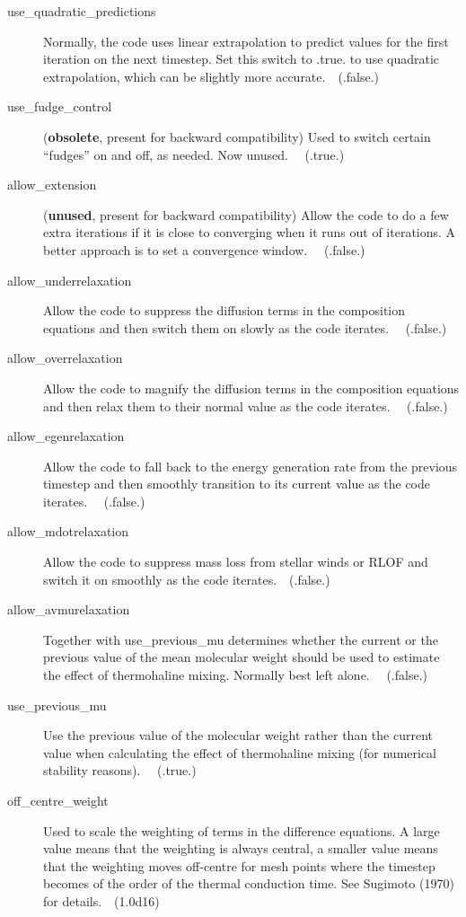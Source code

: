 \begin{description}
\item[use\_quadratic\_predictions]\hypertarget{use_quadratic_predictions}{} Normally, the code uses linear extrapolation to predict values for the first iteration on the next timestep. Set this switch to .true. to use quadratic extrapolation, which can be slightly more accurate.\ \ (.false.)
\item[use\_fudge\_control]\hypertarget{use_fudge_control}{}      (\textbf{obsolete}, present for backward compatibility)  Used to switch certain ``fudges'' on and off, as needed. Now unused. \ \ (.true.)
\item[allow\_extension]\hypertarget{allow_extension}{} (\textbf{unused}, present for backward compatibility) Allow the code to do a few extra iterations if it is close to converging when it runs out of iterations. A better approach is to set a convergence window.  \ \ (.false.)
\item[allow\_underrelaxation]\hypertarget{allow_underrelaxation}{}  Allow the code to suppress the diffusion terms in the composition equations and then switch them on slowly as the code iterates.  \ \ (.false.)
\item[allow\_overrelaxation]\hypertarget{allow_overrelaxation}{}    Allow the code to magnify the diffusion terms in the composition equations and then relax them to their normal value as the code iterates.  \ \ (.false.)
\item[allow\_egenrelaxation]\hypertarget{allow_egenrelaxation}{}    Allow the code to fall back to the energy generation rate from the previous timestep and then smoothly transition to its current value as the code iterates. \ \ (.false.)
\item[allow\_mdotrelaxation]\hypertarget{allow_mdotrelaxation}{}    Allow the code to suppress mass loss from stellar winds or RLOF and switch it on smoothly as the code iterates.\ \ (.false.)
\item[allow\_avmurelaxation]\hypertarget{allow_avmurelaxation}{}   Together with use\_previous\_mu determines whether the current or the previous value of the mean molecular weight should be used to estimate the effect of thermohaline mixing. Normally best left alone. \ \ (.false.)
\item[use\_previous\_mu]\hypertarget{use_previous_mu}{}        Use the previous value of the molecular weight rather than the current value when calculating the effect of thermohaline mixing (for numerical stability reasons).  \ \ (.true.)
\item[off\_centre\_weight]\hypertarget{off_centre_weight}{}      Used to scale the weighting of terms in the difference equations. A large value means that the weighting is always central, a smaller value means that the weighting moves off-centre for mesh points where the timestep becomes of the order of the thermal conduction time. See Sugimoto (1970) for details.\ \ (1.0d16)
\end{description}





